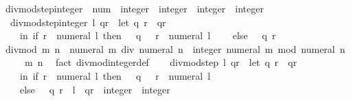\begin{isabellebody}
\isanewline
{}\isamarkupfalse%
\ divmod{\isacharunderscore}{\kern0pt}step{\isacharunderscore}{\kern0pt}integer\ {\isacharcolon}{\kern0pt}{\isacharcolon}{\kern0pt}\ {\isachardoublequoteopen}num\ {\isasymRightarrow}\ integer\ {\isasymtimes}\ integer\ {\isasymRightarrow}\ integer\ {\isasymtimes}\ integer{\isachardoublequoteclose}\isanewline
{}\isanewline
\ \ {\isachardoublequoteopen}divmod{\isacharunderscore}{\kern0pt}step{\isacharunderscore}{\kern0pt}integer\ l\ qr\ {\isacharequal}{\kern0pt}\ {\isacharparenleft}{\kern0pt}let\ {\isacharparenleft}{\kern0pt}q{\isacharcomma}{\kern0pt}\ r{\isacharparenright}{\kern0pt}\ {\isacharequal}{\kern0pt}\ qr\isanewline
\ \ \ \ in\ if\ r\ {\isasymge}\ numeral\ l\ then\ {\isacharparenleft}{\kern0pt}{}\ {\isacharasterisk}{\kern0pt}\ q\ {\isacharplus}{\kern0pt}\ {}{\isacharcomma}{\kern0pt}\ r\ {\isacharminus}{\kern0pt}\ numeral\ l{\isacharparenright}{\kern0pt}\isanewline
\ \ \ \ else\ {\isacharparenleft}{\kern0pt}{}\ {\isacharasterisk}{\kern0pt}\ q{\isacharcomma}{\kern0pt}\ r{\isacharparenright}{\kern0pt}{\isacharparenright}{\kern0pt}{\isachardoublequoteclose}\isanewline
\isanewline
{}\isamarkupfalse%
%
\isadelimproof
\ %
\endisadelimproof
%
\isatagproof
{}\isamarkupfalse%
\isanewline
\ \ \isamarkupfalse%
\ {\isachardoublequoteopen}divmod\ m\ n\ {\isacharequal}{\kern0pt}\ {\isacharparenleft}{\kern0pt}numeral\ m\ div\ numeral\ n\ {\isacharcolon}{\kern0pt}{\isacharcolon}{\kern0pt}\ integer{\isacharcomma}{\kern0pt}\ numeral\ m\ mod\ numeral\ n{\isacharparenright}{\kern0pt}{\isachardoublequoteclose}\isanewline
\ \ \ \ \ m\ n\ \isamarkupfalse%
\ {\isacharparenleft}{\kern0pt}fact\ divmod{\isacharunderscore}{\kern0pt}integer{\isacharprime}{\kern0pt}{\isacharunderscore}{\kern0pt}def{\isacharparenright}{\kern0pt}\isanewline
\ \ \isamarkupfalse%
\ {\isachardoublequoteopen}divmod{\isacharunderscore}{\kern0pt}step\ l\ qr\ {\isacharequal}{\kern0pt}\ {\isacharparenleft}{\kern0pt}let\ {\isacharparenleft}{\kern0pt}q{\isacharcomma}{\kern0pt}\ r{\isacharparenright}{\kern0pt}\ {\isacharequal}{\kern0pt}\ qr\isanewline
\ \ \ \ in\ if\ r\ {\isasymge}\ numeral\ l\ then\ {\isacharparenleft}{\kern0pt}{}\ {\isacharasterisk}{\kern0pt}\ q\ {\isacharplus}{\kern0pt}\ {}{\isacharcomma}{\kern0pt}\ r\ {\isacharminus}{\kern0pt}\ numeral\ l{\isacharparenright}{\kern0pt}\isanewline
\ \ \ \ else\ {\isacharparenleft}{\kern0pt}{}\ {\isacharasterisk}{\kern0pt}\ q{\isacharcomma}{\kern0pt}\ r{\isacharparenright}{\kern0pt}{\isacharparenright}{\kern0pt}{\isachardoublequoteclose}\ \ l\ \ qr\ {\isacharcolon}{\kern0pt}{\isacharcolon}{\kern0pt}\ {\isachardoublequoteopen}integer\ {\isasymtimes}\ integer{\isachardoublequoteclose}\isanewline

\end{isabellebody}
